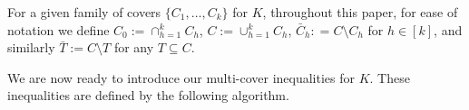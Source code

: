 
For a given family of covers $\{C_1, \ldots, C_k\}$ for $K$, 
throughout this paper,
for ease of notation we define 
$C_0 := \cap_{h=1}^k C_h$, 
$C := \cup_{h=1}^k C_h$, 
$\bar C_h: = C \setminus C_h$ for $h \in [k]$,
and similarly $\bar T := C \setminus T$ for any $T \subseteq C$. 

We are now ready to introduce our multi-cover inequalities for $K$.
These inequalities are defined by the following algorithm.




